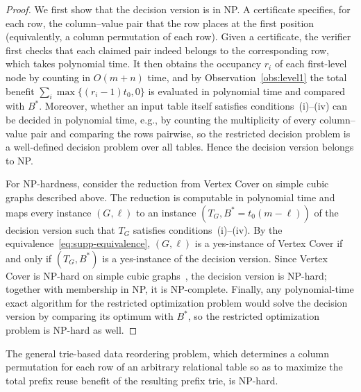 \begin{proof}
We first show that the decision version is in NP. A certificate specifies, for each row, the column--value pair that the row places at the first position (equivalently, a column permutation of each row). Given a certificate, the verifier first checks that each claimed pair indeed belongs to the corresponding row, which takes polynomial time. It then obtains the occupancy $r_i$ of each first-level node by counting in $O(m+n)$ time, and by Observation~\ref{obs:level1} the total benefit $\sum_{i}\max\{(r_i-1)t_0,0\}$ is evaluated in polynomial time and compared with $B^{*}$. Moreover, whether an input table itself satisfies conditions~(i)--(iv) can be decided in polynomial time, e.g., by counting the multiplicity of every column--value pair and comparing the rows pairwise, so the restricted decision problem is a well-defined decision problem over all tables. Hence the decision version belongs to NP.

For NP-hardness, consider the reduction from Vertex Cover on simple cubic graphs described above. The reduction is computable in polynomial time and maps every instance $(G,\ell)$ to an instance $(T_G, B^{*}=t_0(m-\ell))$ of the decision version such that $T_G$ satisfies conditions~(i)--(iv). By the equivalence~\eqref{eq:supp-equivalence}, $(G,\ell)$ is a yes-instance of Vertex Cover if and only if $(T_G,B^{*})$ is a yes-instance of the decision version. Since Vertex Cover is NP-hard on simple cubic graphs~\cite{AlimontiKann2000}, the decision version is NP-hard; together with membership in NP, it is NP-complete. Finally, any polynomial-time exact algorithm for the restricted optimization problem would solve the decision version by comparing its optimum with $B^{*}$, so the restricted optimization problem is NP-hard as well.
\end{proof}

\begin{corollary}
\label{cor:general-np-hard}
The general trie-based data reordering problem, which determines a column permutation for each row of an arbitrary relational table so as to maximize the total prefix reuse benefit of the resulting prefix trie, is NP-hard.
\end{corollary}

